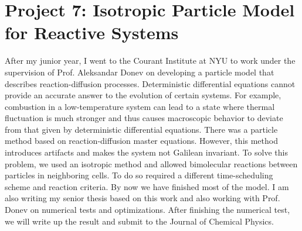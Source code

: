\documentclass[psamsfonts,reqno]{amsart}
\theoremstyle{definition}
\begin{document}
\section*{Project 7: Isotropic Particle Model for Reactive Systems}

After my junior year, I went to the Courant Institute at NYU to work under the supervision of Prof. Aleksandar Donev on developing a particle model that describes reaction-diffusion processes. Deterministic differential equations cannot provide an accurate answer to the evolution of certain systems. For example, combustion in a low-temperature system can lead to a state where thermal fluctuation is much stronger and thus causes macroscopic behavior to deviate from that given by deterministic differential equations. There was a particle method based on reaction-diffusion master equations. However, this method introduces artifacts and makes the system not Galilean invariant. To solve this problem, we used an isotropic method and allowed bimolecular reactions between particles in neighboring cells. To do so required a different time-scheduling scheme and reaction criteria. By now we have finished most of the model. I am also writing my senior thesis based on this work and also working with Prof. Donev on numerical tests and optimizations. After finishing the numerical test, we will write up the result and submit to the Journal of Chemical Physics.

 
\end{document}
